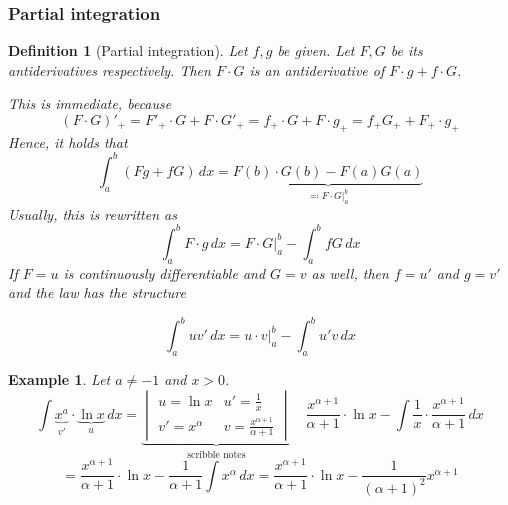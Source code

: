 \documentclass{article}
\newtheorem{example}{Example}  \numberwithin{example}{section}
\newtheorem{definition}{Definition}  \numberwithin{definition}{section}
\begin{document}
\subsubsection{Partial integration}

\begin{definition}[Partial integration]
  Let $f, g$ be given. Let $F, G$ be its antiderivatives respectively.
  Then $F \cdot G$ is an antiderivative of $F \cdot g + f \cdot G$.

  This is immediate, because
  \[
    (F \cdot G)'_+ = F'_+ \cdot G + F \cdot G'_+
    = f_+ \cdot G + F \cdot g_+ = f_+ G_+ + F_+ \cdot g_+
  \]
  Hence, it holds that
  \[
    \int_a^b (F g + f G) \, dx
    = \underbrace{F(b) \cdot G(b) - F(a) G(a)}_{\eqqcolon \left.F \cdot G\right|_a^b}
  \]
  Usually, this is rewritten as
  \[ \int_a^b F \cdot g \, dx = \left. F \cdot G\right|_a^b - \int_a^b f G \, dx \]
  If $F = u$ is continuously differentiable and $G = v$ as well,
  then $f = u'$ and $g = v'$ and the law has the structure
  \begin{framed}
    \[ \int_a^b uv' \, dx = \left.u\cdot v\right|_a^b - \int_a^b u'v \, dx \]
  \end{framed}
\end{definition}

\begin{example}
  Let $a \neq -1$ and $x > 0$.
  \[
    \int \underbrace{x^a}_{v'} \cdot \underbrace{\ln{x}}_{u} \, dx =
    \underbrace{\begin{vmatrix}
      u = \ln{x} & u' = \frac1x \\
      v' = x^\alpha & v = \frac{x^{\alpha+1}}{\alpha + 1}
    \end{vmatrix}}_{\text{scribble notes}}
    \quad
    \frac{x^{\alpha + 1}}{\alpha + 1} \cdot \ln{x} - \int \frac1{x} \cdot \frac{x^{\alpha+1}}{\alpha + 1} \, dx
  \] \[
    = \frac{x^{\alpha+1}}{\alpha + 1} \cdot \ln{x} - \frac{1}{\alpha + 1} \int x^\alpha \, dx
    = \frac{x^{\alpha+1}}{\alpha + 1} \cdot \ln{x} - \frac{1}{(\alpha + 1)^2} x^{\alpha+1}
  \]
\end{example}
\end{document}
